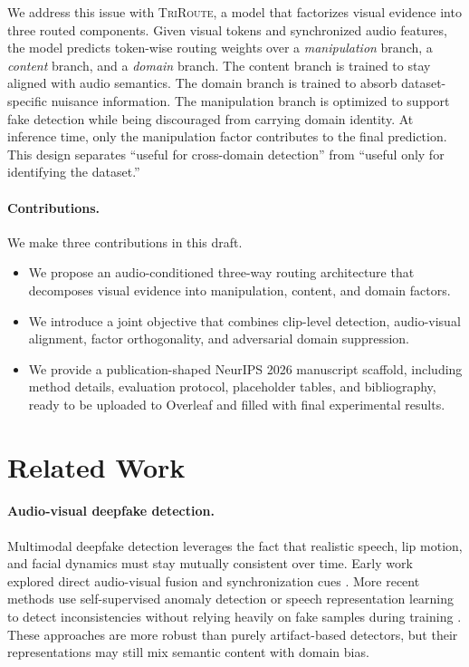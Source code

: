 \documentclass{article}
\newcommand{\method}{\textsc{TriRoute}}
\begin{document}
We address this issue with \method, a model that factorizes visual evidence into three routed components. Given visual tokens and synchronized audio features, the model predicts token-wise routing weights over a \emph{manipulation} branch, a \emph{content} branch, and a \emph{domain} branch. The content branch is trained to stay aligned with audio semantics. The domain branch is trained to absorb dataset-specific nuisance information. The manipulation branch is optimized to support fake detection while being discouraged from carrying domain identity. At inference time, only the manipulation factor contributes to the final prediction. This design separates ``useful for cross-domain detection'' from ``useful only for identifying the dataset.''

\paragraph{Contributions.}
We make three contributions in this draft.
\begin{itemize}
\item We propose an audio-conditioned three-way routing architecture that decomposes visual evidence into manipulation, content, and domain factors.
\item We introduce a joint objective that combines clip-level detection, audio-visual alignment, factor orthogonality, and adversarial domain suppression.
\item We provide a publication-shaped NeurIPS 2026 manuscript scaffold, including method details, evaluation protocol, placeholder tables, and bibliography, ready to be uploaded to Overleaf and filled with final experimental results.
\end{itemize}

\section{Related Work}

\paragraph{Audio-visual deepfake detection.}
Multimodal deepfake detection leverages the fact that realistic speech, lip motion, and facial dynamics must stay mutually consistent over time. Early work explored direct audio-visual fusion and synchronization cues \citep{zhou2021jointav, chung2016syncnet}. More recent methods use self-supervised anomaly detection or speech representation learning to detect inconsistencies without relying heavily on fake samples during training \citep{feng2023avad, liang2024speechforensics, smeu2025avhalign}. These approaches are more robust than purely artifact-based detectors, but their representations may still mix semantic content with domain bias.
\end{document}
